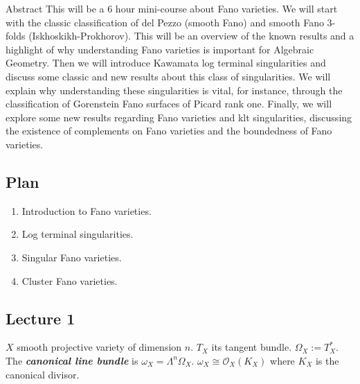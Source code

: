 \begin{thing4}{Abstract}
This will be a 6 hour mini-course about Fano varieties.
We will start with the classic classification of del Pezzo (smooth
Fano) and smooth Fano 3-folds (Iskhoskikh-Prokhorov). This will
be an overview of the known results and a highlight of why understanding Fano varieties is important for Algebraic Geometry. Then
we will introduce Kawamata log terminal singularities and discuss
some classic and new results about this class of singularities. We will
explain why understanding these singularities is vital, for instance,
through the classification of Gorenstein Fano surfaces of Picard rank
one. Finally, we will explore some new results regarding Fano varieties and klt singularities, discussing the existence of complements
on Fano varieties and the boundedness of Fano varieties.
\end{thing4}
\vspace{2em}

\subsection*{Plan}

\begin{enumerate}
	\item Introduction to Fano varieties.
	\item Log terminal singularities.
	\item Singular Fano varieties.
	\item Cluster Fano varieties.
\end{enumerate}

\subsection{Lecture 1}

$X$ smooth projective variety of dimension $n$. $T_{X}$ its tangent bundle. $\Omega_{X}:=T^{*}_{X}$. The \textit{\textbf{canonical line bundle}} is  $\omega_{X}=\Lambda^{n} \Omega_{X}$. $\omega_{X}\cong \mathcal{O}_{X}(K_{X})$ where $K_{X}$ is the canonical divisor.

